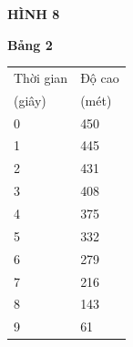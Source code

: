 

\noindent
\begin{minipage}[t]{0.265\textwidth}
    \fontsize{8pt}{10.5pt}\selectfont
    \vspace*{110pt}
    \raggedright
    \textbf{\textsf{HÌNH 8}}

    \vspace*{58pt}
    \begin{center}
        {\small\textbf{\textsf{Bảng 2}}}\\[4pt]
        \renewcommand{\arraystretch}{1.15}
        \setlength{\tabcolsep}{6pt}
        \begin{tabular}{|C{1.1cm}|C{1.1cm}|}
            \hline
            \textsf{Thời gian} & \textsf{Độ cao} \\
            \textsf{(giây)} & \textsf{(mét)} \\
             & 450 \\
            1 & 445 \\
            2 & 431 \\
            3 & 408 \\
            4 & 375 \\
            5 & 332 \\
            6 & 279 \\
            7 & 216 \\
            8 & 143 \\
            9 & \phantom{0}61 \\
            \hline
        \end{tabular}
    \end{center}
\end{minipage}%
\hfill
